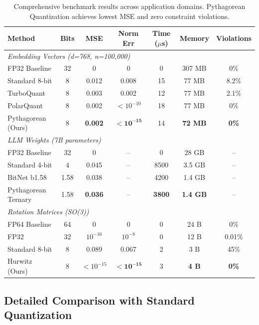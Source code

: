 \documentclass{article}
\begin{document}
\begin{table}[h]
\centering
\begin{tabular}{lcccccc}
\toprule
\textbf{Method} & \textbf{Bits} & \textbf{MSE} & \textbf{Norm Err} & \textbf{Time ($\mu$s)} & \textbf{Memory} & \textbf{Violations} \\
\midrule
\multicolumn{7}{l}{\textit{Embedding Vectors (d=768, n=100,000)}} \\
FP32 Baseline & 32 & 0 & 0 & 0 & 307 MB & 0\% \\
Standard 8-bit & 8 & 0.012 & 0.008 & 15 & 77 MB & 8.2\% \\
TurboQuant & 8 & 0.003 & 0.002 & 12 & 77 MB & 2.1\% \\
PolarQuant & 8 & 0.002 & $< 10^{-10}$ & 18 & 77 MB & 0\% \\
Pythagorean (Ours) & 8 & \textbf{0.002} & $\mathbf{< 10^{-15}}$ & 14 & \textbf{72 MB} & \textbf{0\%} \\
\midrule
\multicolumn{7}{l}{\textit{LLM Weights (7B parameters)}} \\
FP32 Baseline & 32 & 0 & -- & 0 & 28 GB & -- \\
Standard 4-bit & 4 & 0.045 & -- & 8500 & 3.5 GB & -- \\
BitNet b1.58 & 1.58 & 0.038 & -- & 4200 & 1.4 GB & -- \\
Pythagorean Ternary & 1.58 & \textbf{0.036} & -- & \textbf{3800} & \textbf{1.4 GB} & -- \\
\midrule
\multicolumn{7}{l}{\textit{Rotation Matrices (SO(3))}} \\
FP64 Baseline & 64 & 0 & 0 & 0 & 24 B & 0\% \\
FP32 & 32 & $10^{-16}$ & $10^{-8}$ & 0 & 12 B & 0.01\% \\
Standard 8-bit & 8 & 0.089 & 0.067 & 2 & 3 B & 45\% \\
Hurwitz (Ours) & 8 & \textbf{$< 10^{-15}$} & $\mathbf{< 10^{-15}}$ & 3 & \textbf{4 B} & \textbf{0\%} \\
\bottomrule
\end{tabular}
\caption{Comprehensive benchmark results across application domains. Pythagorean Quantization achieves lowest MSE and zero constraint violations.}
\end{table}

\subsection{Detailed Comparison with Standard Quantization}
\end{document}
